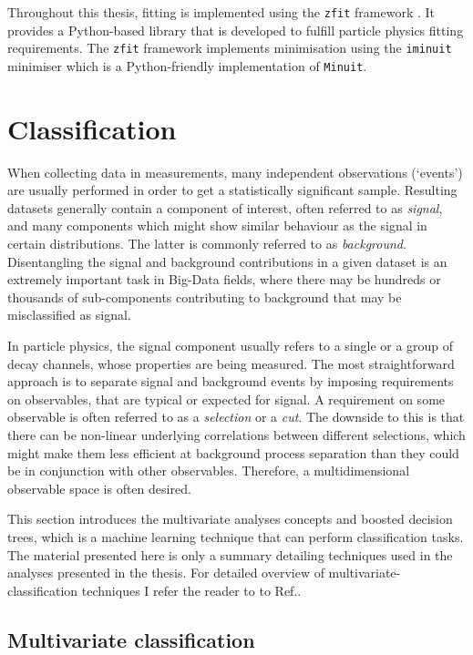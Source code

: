 Throughout this thesis, fitting is implemented using the \texttt{zfit} framework \cite{ESCHLE2020100508}. 
It provides a Python-based library that is developed to fulfill particle physics fitting requirements.
The \texttt{zfit} framework implements minimisation using the \texttt{iminuit} minimiser \cite{iminuit} which is a Python-friendly implementation of \texttt{Minuit}.

\section{Classification}

When collecting data in measurements, many independent observations (`events') are usually performed in order to get a statistically significant sample.
Resulting datasets generally contain a component of interest, often referred to as \textit{signal}, and many components which might show similar behaviour as the signal in certain distributions. 
The latter is commonly referred to as \textit{background}. Disentangling the signal and background contributions in a given dataset is an extremely important task in Big-Data fields, where there may be hundreds or thousands of sub-components contributing to background that may be misclassified as signal.

In particle physics, the signal component usually refers to a single or a group of decay channels, whose properties are being measured. 
The most straightforward approach is to separate signal and background events by imposing requirements on observables, that are typical or expected for signal.
A requirement on some observable is often referred to as a \textit{selection} or a \textit{cut}.
The downside to this is that there can be non-linear underlying correlations between different selections, which might make them less efficient at background process separation than they could be in conjunction with other observables. 
Therefore, a multidimensional observable space is often desired.

This section introduces the multivariate analyses concepts and boosted decision trees, which is a machine learning technique that can perform classification tasks. 
The material presented here is only a summary detailing techniques used in the analyses presented in the thesis.
For detailed overview of multivariate-classification techniques I refer the reader to to Ref.\cite{Behnke:2013pga}.

\subsection{Multivariate classification}